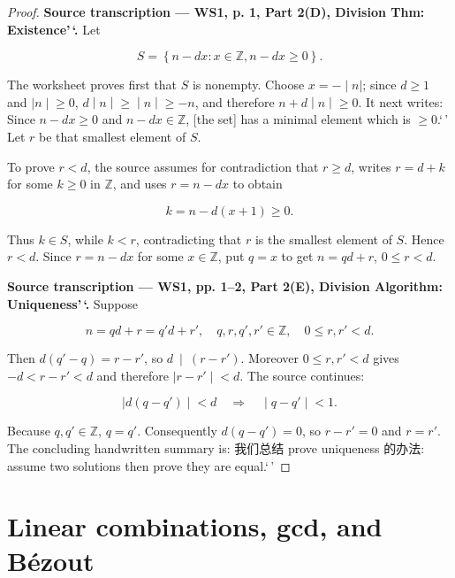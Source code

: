 \begin{proof}

\textbf{Source transcription --- WS1, p. 1, Part 2(D), Division Thm: Existence'\,`.} Let

\[S = \left\{ {n - dx:x \in \mathbb{Z},n - dx \geq 0} \right\}.\]

The worksheet proves first that \(S\) is nonempty. Choose \(\left. x = - \middle| n| \right.\); since \(d \geq 1\) and \(\left. |n \middle| \geq 0 \right.\), \(\left. d \middle| n \middle| \geq \middle| n \middle| \geq - n \right.\), and therefore \(\left. n + d \middle| n \middle| \geq 0 \right.\). It next writes: Since \(n - dx \geq 0\) and \(n - dx \in \mathbb{Z}\), {[}the set{]} has a minimal element which is \(\geq 0\).`\,' Let \(r\) be that smallest element of \(S\).

To prove \(r < d\), the source assumes for contradiction that \(r \geq d\), writes \(r = d + k\) for some \(k \geq 0\) in \(\mathbb{Z}\), and uses \(r = n - dx\) to obtain

\[k = n - d\left( {x + 1} \right) \geq 0.\]

Thus \(k \in S\), while \(k < r\), contradicting that \(r\) is the smallest element of \(S\). Hence \(r < d\). Since \(r = n - dx\) for some \(x \in \mathbb{Z}\), put \(q = x\) to get \(n = qd + r\), \(0 \leq r < d\).

\textbf{Source transcription --- WS1, pp. 1--2, Part 2(E), Division Algorithm: Uniqueness'\,`.} Suppose

\[n = qd + r = q'd + r',\quad q,r,q',r' \in \mathbb{Z},\quad 0 \leq r,r' < d.\]

Then \(d\left( {q' - q} \right) = r - r'\), so \(\left. d\  \middle| \ \left( {r - r'} \right) \right.\). Moreover \(0 \leq r,r' < d\) gives \(- d < r - r' < d\) and therefore \(\left. |r - r' \middle| < d \right.\). The source continues:

\[\left. |d\left( {q - q'} \right) \middle| < d\quad\Rightarrow\quad \middle| q - q' \middle| < 1. \right.\]

Because \(q,q' \in \mathbb{Z}\), \(q = q'\). Consequently \(d\left( {q - q'} \right) = 0\), so \(r - r' = 0\) and \(r = r'\). The concluding handwritten summary is: 我们总结 prove uniqueness 的办法: assume two solutions then prove they are equal.`\,'

\end{proof}

\section{Linear combinations, gcd, and Bézout}

